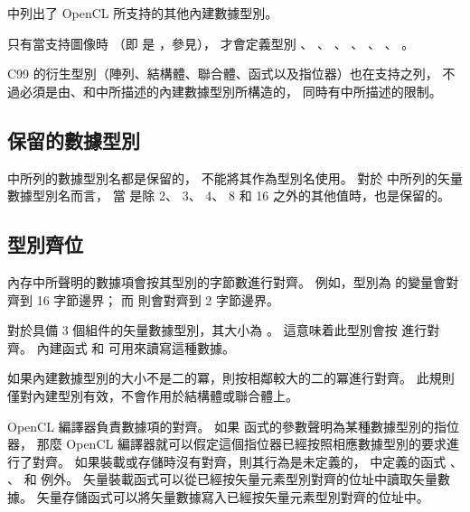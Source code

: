 中列出了 OpenCL 所支持的其他內建數據型別。

{}

\startnotepar
只有當支持圖像時
（即  是 ，參見），
才會定義型別 、 、 、
 、 、 、
 。
\stopnotepar

C99 的衍生型別（陣列、結構體、聯合體、函式以及指位器）也在支持之列，
不過必須是由\insection[bisdt]、\insection[bivdt]
和\insection[obidt]中所描述的內建數據型別所構造的，
同時有\insection[restrictions]中所描述的限制。

\subsection{保留的數據型別}

 中所列的數據型別名都是保留的，
不能將其作為型別名使用。
對於 中所列的矢量數據型別名而言，
當  是除 2、 3、 4、 8 和 16 之外的其他值時，也是保留的。

{}

\subsection[section:alignmentOfTypes]{型別齊位}

內存中所聲明的數據項會按其型別的字節數進行對齊。
例如，型別為  的變量會對齊到 16 字節邊界；
而  則會對齊到 2 字節邊界。

對於具備 3 個組件的矢量數據型別，其大小為 。
這意味着此型別會按  進行對齊。
內建函式  和  可用來讀寫這種數據。

如果內建數據型別的大小不是二的冪，則按相鄰較大的二的冪進行對齊。
此規則僅對內建型別有效，不會作用於結構體或聯合體上。

OpenCL 編譯器負責數據項的對齊。
如果  函式的參數聲明為某種數據型別的指位器，
那麼 OpenCL 編譯器就可以假定這個指位器已經按照相應數據型別的要求進行了對齊。
如果裝載或存儲時沒有對齊，則其行為是未定義的，
\insection[vectorLsFunc]中定義的函式 、 、
  和  例外。
矢量裝載函式可以從已經按矢量元素型別對齊的位址中讀取矢量數據。
矢量存儲函式可以將矢量數據寫入已經按矢量元素型別對齊的位址中。

